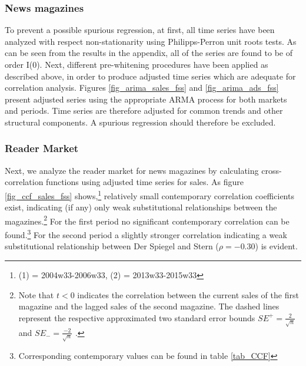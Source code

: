 \documentclass[12pt,a4paper,notitlepage]{article}
\begin{document}
\subsubsection{News magazines}

To prevent a possible spurious regression, at first, all time series have been analyzed with respect non-stationarity using Philipps-Perron unit roots tests. As can be seen from the results in the appendix, all of the series are found to be of order I(0). Next, different pre-whitening procedures have been applied as described above, in order to produce adjusted time series which are adequate for correlation analysis. Figures \ref{fig_arima_sales_fss} and \ref{fig_arima_ads_fss} present adjusted series using the appropriate ARMA process for both markets and periods. Time series are therefore adjusted for common trends and other structural components. A spurious regression should therefore be excluded.  

\subsubsection{Reader Market}

Next, we analyze the reader market for news magazines by calculating cross-correlation functions using adjusted time series for sales. As figure \ref{fig_ccf_sales_fss} shows,\footnote{(1) = 2004w33-2006w33, (2) = 2013w33-2015w33} relatively small contemporary correlation coefficients exist, indicating (if any) only weak substitutional relationships between the magazines.\footnote{Note that $t<0$ indicates the correlation between the current sales of the first magazine and the lagged sales of the second magazine. The dashed lines represent the respective approximated two standard error bounds $SE^+=\frac{2}{\sqrt{n}}$ and $SE_-=\frac{-2}{\sqrt{n}}$ \citep{tiao_modeling_1981}.} For the first period no significant contemporary correlation can be found.\footnote{Corresponding contemporary values can be found in table \ref{tab_CCF}} For the second period a slightly stronger correlation indicating a weak substitutional relationship between Der Spiegel and Stern ($\rho=-0.30$) is evident.
\end{document}

